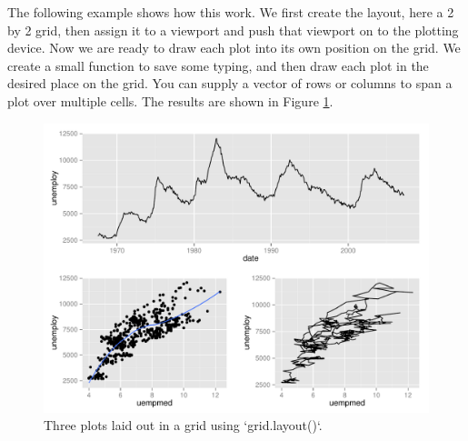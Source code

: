 The following example shows how this work. We first create the layout,
here a 2 by 2 grid, then assign it to a viewport and push that viewport
on to the plotting device. Now we are ready to draw each plot into its
own position on the grid. We create a small function to save some
typing, and then draw each plot in the desired place on the grid. You
can supply a vector of rows or columns to span a plot over multiple
cells. The results are shown in Figure \ref{fig:layout-2}.

\begin{Shaded}
\begin{Highlighting}[]
\NormalTok{(}\NormalTok{, } \NormalTok{, } \NormalTok{)}
\NormalTok{()}
\NormalTok{(}\NormalTok{(} \NormalTok{(}\NormalTok{, }\NormalTok{)))}

\StringTok{ }
  \NormalTok{(}  
 \NormalTok{(}\NormalTok{, }\NormalTok{:}\NormalTok{))}
 \NormalTok{(}\NormalTok{, }\NormalTok{))}
 \NormalTok{(}\NormalTok{, }\NormalTok{))}
\NormalTok{()}
\end{Highlighting}
\end{Shaded}

\begin{figure}[htbp]
  \centering
    \includegraphics[width=\linewidth]{diagrams/polishing-layout}
  \caption{Three plots laid out in a grid using `grid.layout()`.}
  \label{fig:layout-2}
\end{figure}

